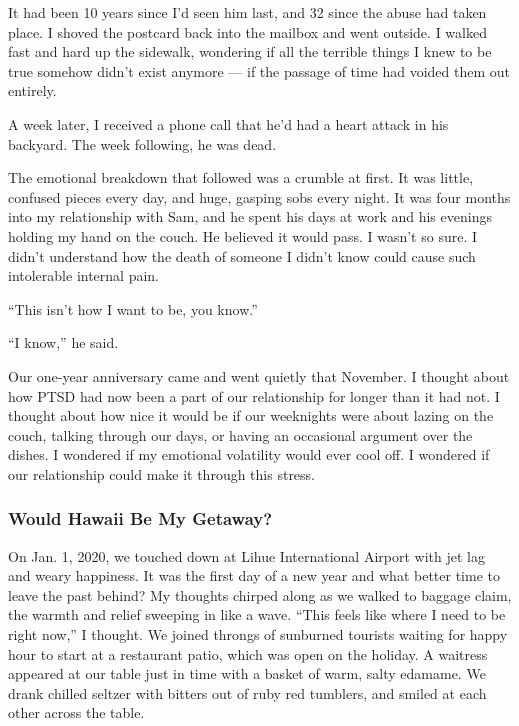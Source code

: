 It had been 10 years since I'd seen him last, and 32 since the abuse had
taken place. I shoved the postcard back into the mailbox and went
outside. I walked fast and hard up the sidewalk, wondering if all the
terrible things I knew to be true somehow didn't exist anymore --- if
the passage of time had voided them out entirely.

A week later, I received a phone call that he'd had a heart attack in
his backyard. The week following, he was dead.

The emotional breakdown that followed was a crumble at first. It was
little, confused pieces every day, and huge, gasping sobs every night.
It was four months into my relationship with Sam, and he spent his days
at work and his evenings holding my hand on the couch. He believed it
would pass. I wasn't so sure. I didn't understand how the death of
someone I didn't know could cause such intolerable internal pain.

``This isn't how I want to be, you know.''

``I know,'' he said.

Our one-year anniversary came and went quietly that November. I thought
about how PTSD had now been a part of our relationship for longer than
it had not. I thought about how nice it would be if our weeknights were
about lazing on the couch, talking through our days, or having an
occasional argument over the dishes. I wondered if my emotional
volatility would ever cool off. I wondered if our relationship could
make it through this stress.

\hypertarget{would-hawaii-be-my-getaway}{%
\subsubsection{Would Hawaii Be My
Getaway?}\label{would-hawaii-be-my-getaway}}

On Jan. 1, 2020, we touched down at Lihue International Airport with jet
lag and weary happiness. It was the first day of a new year and what
better time to leave the past behind? My thoughts chirped along as we
walked to baggage claim, the warmth and relief sweeping in like a wave.
``This feels like where I need to be right now,'' I thought. We joined
throngs of sunburned tourists waiting for happy hour to start at a
restaurant patio, which was open on the holiday. A waitress appeared at
our table just in time with a basket of warm, salty edamame. We drank
chilled seltzer with bitters out of ruby red tumblers, and smiled at
each other across the table.


